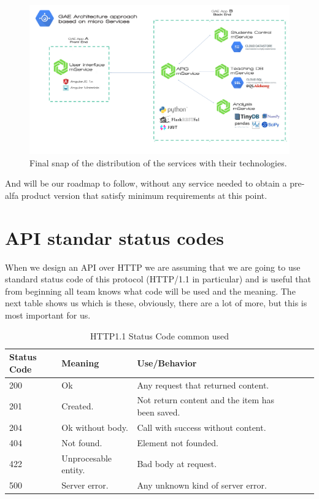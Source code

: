 \begin{figure}[H]
  \includegraphics[scale=0.15]{img/graphics/GAE_final_architecture.png}
  \centering
  \caption{Final snap of the distribution of the services with their technologies.}
\end{figure}

\noindent And will be our roadmap to follow, without any service needed to obtain a pre-alfa
product version that satisfy minimum requirements at this point.


\section{API standar status codes}

When we design an API over HTTP we are assuming that we are going to use standard
status code of this protocol (HTTP/1.1 in particular) and is useful that from beginning
all team knows what code will be used and the meaning. The next table shows us which is these,
obviously, there are a lot of more, but this is most important for us.

\begin{table}[H]
\centering

\begin{tabular}{@{}lllllll@{}}

Status Code & Meaning & Use/Behavior\\
\midrule

200 & Ok & Any request that returned content.\\
201 & Created. & Not return content and the item has been saved.\\
204 & Ok without body. & Call with success without content. \\
404 & Not found. & Element not founded.\\
422 & Unprocesable entity. & Bad body at request.\\
500 & Server error. & Any unknown kind of server error.\\

\end{tabular}
\caption{HTTP1.1 Status Code common used}
\label{my-label}
\end{table}

